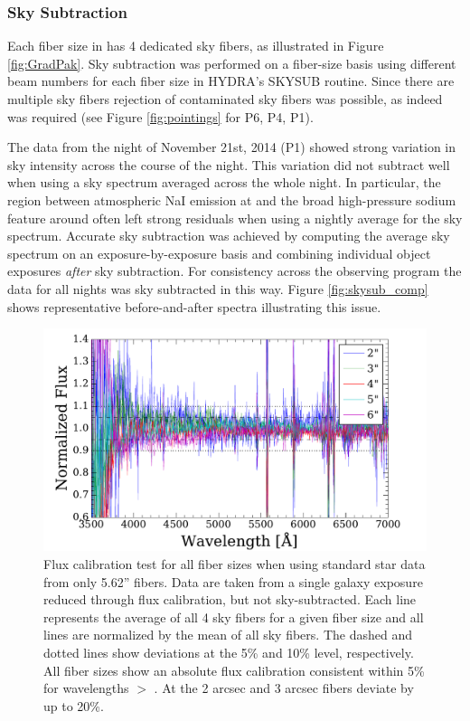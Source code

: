 \subsubsection{Sky Subtraction}
\label{sec:skysub}

Each fiber size in \GP has 4 dedicated sky fibers, as illustrated in
Figure \ref{fig:GradPak}.  Sky subtraction was performed on a
fiber-size basis using different beam numbers for each fiber size in
HYDRA's SKYSUB routine.  Since there are multiple sky fibers rejection
of contaminated sky fibers was possible, as indeed was required (see
Figure \ref{fig:pointings} for P6, P4, P1).

The data from the night of November 21st, 2014 (P1) showed strong
variation in sky intensity across the course of the night. This
variation did not subtract well when using a sky spectrum averaged
across the whole night. In particular, the region between atmospheric
NaI emission at  and the broad high-pressure sodium
feature around  often left strong residuals when using
a nightly average for the sky spectrum. Accurate sky subtraction was
achieved by computing the average sky spectrum on an
exposure-by-exposure basis and combining individual object exposures
\emph{after} sky subtraction. For consistency across the observing
program the data for all nights was sky subtracted in this way. Figure
\ref{fig:skysub_comp} shows representative before-and-after spectra
illustrating this issue.

\begin{figure}
  \centering
  \includegraphics[width=\columnwidth]{891_1/figs/flux_cal_test.pdf}
  \caption{\label{fig:sky_flux_comp}\fixspacing Flux calibration test
    for all fiber sizes when using standard star data from only 5.62''
    fibers. Data are taken from a single galaxy exposure reduced
    through flux calibration, but not sky-subtracted. Each line
    represents the average of all 4 sky fibers for a given fiber size
    and all lines are normalized by the mean of all sky fibers. The
    dashed and dotted lines show deviations at the 5\% and 10\% level,
    respectively. All fiber sizes show an absolute flux calibration
    consistent within 5\% for wavelengths $>$ . At
     the 2 arcsec and 3 arcsec fibers deviate by up to
    20\%.}
\end{figure}

